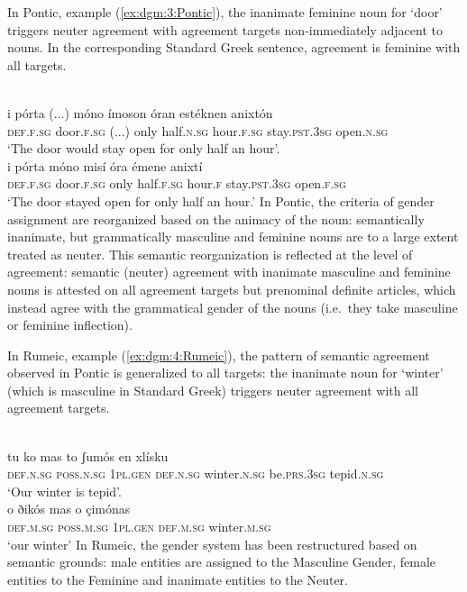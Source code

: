 \documentclass[output=collectionpaper]{langsci/langscibook}
\begin{document}
In Pontic, example (\ref{ex:dgm:3:Pontic}), the inanimate feminine noun for `door' triggers neuter agreement with agreement targets non-immediately adjacent to nouns. In the corresponding Standard Greek sentence, agreement is feminine with all targets.

\ea\label{ex:dgm:3:Pontic}
\ea
{}\\
\gll i p\'orta (...) m\'ono \'imoson \'oran est\'eknen anixt\'on \\
\textsc{def.f.sg} door.\textsc{f.sg} (...) only half.\textsc{n.sg} hour.\textsc{f.sg} stay.\textsc{pst.3sg} open\textsc{.n.sg} \\
\glt `The door would stay open for only half an hour'.
\ex
{}\\
\gll i p\'orta m\'ono mis\'i \'ora \'emene anixt\'i \\
\textsc{def.f.sg} door.\textsc{f.sg} only half\textsc{.f.sg} hour\textsc{.f} stay.\textsc{pst.3sg} open.\textsc{f.sg}\\
\glt `The door stayed open for only half an hour.'
\z
\z
In Pontic, the criteria of gender assignment are reorganized based on the animacy of the noun: semantically inanimate, but grammatically masculine and feminine nouns are to a large extent treated as neuter. This semantic reorganization is reflected at the level of agreement: semantic (neuter) agreement with inanimate masculine and feminine nouns is attested on all agreement targets but prenominal definite articles, which instead agree with the grammatical gender of the nouns (i.e.\ they take masculine or feminine inflection).

In Rumeic, example (\ref{ex:dgm:4:Rumeic}), the pattern of semantic agreement observed in Pontic is generalized to all targets: the inanimate noun for `winter' (which is masculine in Standard Greek) triggers neuter agreement with all agreement targets.

\ea\label{ex:dgm:4:Rumeic}
\ea
{}\\
\gll tu ko mas to ʃum\'os en xl\'isku\\
\textsc{def.n.sg} \textsc{poss.n.sg} \textsc{1pl.gen} \textsc{def.n.sg} winter.\textsc{n.sg} be.\textsc{prs.3sg} tepid.\textsc{n.sg}\\
\glt `Our winter is tepid'.
\ex
{}\\
\gll o ðik\'os mas o \c{c}im\'onas \\
\textsc{def.m.sg} \textsc{poss.m.sg} \textsc{1pl.gen} \textsc{def.m.sg} winter.\textsc{m.sg} \\
\glt `our winter'
\z
\z
In Rumeic, the gender system has been restructured based on semantic grounds: male entities are assigned to the Masculine Gender, female entities to the Feminine and inanimate entities to the Neuter.
\end{document}
